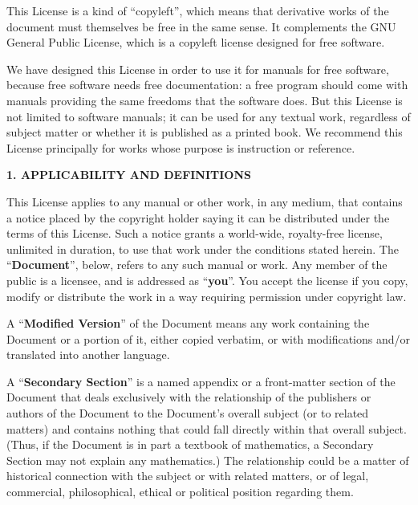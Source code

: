 \documentclass{article}
\begin{document}
	This License is a kind of ``copyleft'', which means that derivative
	works of the document must themselves be free in the same sense.  It
	complements the GNU General Public License, which is a copyleft
	license designed for free software.
	
	We have designed this License in order to use it for manuals for free
	software, because free software needs free documentation: a free
	program should come with manuals providing the same freedoms that the
	software does.  But this License is not limited to software manuals;
	it can be used for any textual work, regardless of subject matter or
	whether it is published as a printed book.  We recommend this License
	principally for works whose purpose is instruction or reference.
	
	
	\begin{center}
		{\Large\bf 1. APPLICABILITY AND DEFINITIONS\par}
	\end{center}
	
	This License applies to any manual or other work, in any medium, that
	contains a notice placed by the copyright holder saying it can be
	distributed under the terms of this License.  Such a notice grants a
	world-wide, royalty-free license, unlimited in duration, to use that
	work under the conditions stated herein.  The ``\textbf{Document}'', below,
	refers to any such manual or work.  Any member of the public is a
	licensee, and is addressed as ``\textbf{you}''.  You accept the license if you
	copy, modify or distribute the work in a way requiring permission
	under copyright law.
	
	A ``\textbf{Modified Version}'' of the Document means any work containing the
	Document or a portion of it, either copied verbatim, or with
	modifications and/or translated into another language.
	
	A ``\textbf{Secondary Section}'' is a named appendix or a front-matter section of
	the Document that deals exclusively with the relationship of the
	publishers or authors of the Document to the Document's overall subject
	(or to related matters) and contains nothing that could fall directly
	within that overall subject.  (Thus, if the Document is in part a
	textbook of mathematics, a Secondary Section may not explain any
	mathematics.)  The relationship could be a matter of historical
	connection with the subject or with related matters, or of legal,
	commercial, philosophical, ethical or political position regarding
	them.
	
\end{document}
